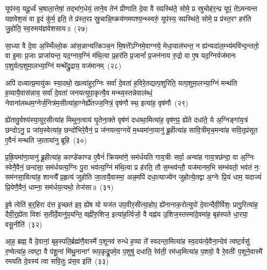 यूप॑स्य॒ यदू॒र्ध्वं च॒षाला॒त्तेषां॒ तद्भा॑ग॒धेयं॒ ताने॒व तेन॑ प्रीणाति दे॒वा वै सꣴस्थि॑ते॒ सोमे॒ प्र स्रुचोह॑र॒न्प्र यूपं॒ ते॑\-ऽमन्यन्त यज्ञवेश॒सं वा इ॒दं कु॑र्म॒ इति॒ ते प्र॑स्त॒रꣴ स्रु॒चान्नि॒ष्क्रय॑णमपश्य॒न्थ्स्वरुं॒ यूप॑स्य॒ सꣴस्थि॑ते॒ सोमे॒ प्र प्र॑स्त॒रꣳ हर॑ति जु॒होति॒ स्व॒रुमय॑ज्ञवेशसाय॥~(२७)

{}%

सा॒ध्या वै दे॒वा अ॒स्मिँल्लो॒क आ॑स॒न्नान्यत्किञ्च॒न मि॒षत्ते᳚\-ऽग्निमे॒वाग्नये॒ मेधा॒याल॑भन्त॒ न ह्य॑न्यदा॑ल॒म्भ्य॑मवि॑न्द॒न्ततो॒ वा इ॒माः प्र॒जाः प्राजा॑यन्त॒ यद॒ग्नाव॒ग्निं म॑थि॒त्वा प्र॒हर॑ति प्र॒जानां᳚ प्र॒जन॑नाय रु॒द्रो वा ए॒ष यद॒ग्निर्यज॑मानः प॒शुर्यत्प॒शुमा॒लभ्या॒ग्निं मन्थे᳚द्रु॒द्राय॒ यज॑मानम्~(२८)

अपि॑ दध्यात्प्र॒मायु॑कः स्या॒दथो॒ खल्वा॑हुर॒ग्निः सर्वा॑ दे॒वता॑ ह॒विरे॒तद्यत्प॒शुरिति॒ यत्प॒शुमा॒लभ्या॒ग्निं मन्थ॑ति ह॒व्यायै॒वास॑न्नाय॒ सर्वा॑ दे॒वता॑ जनयत्युपा॒कृत्यै॒व मन्थ्य॒स्तन्नेवाल॑ब्धं॒ नेवाना॑लब्धम॒ग्नेर्ज॒नित्र॑म॒सीत्या॑हा॒ग्नेर्\mbox{}ह्ये॑तज्ज॒नित्रं॒ वृष॑णौ स्थ॒ इत्या॑ह॒ वृष॑णौ~(२९)

ह्ये॑तावु॒र्वश्य॑स्या॒युर॒सीत्या॑ह मिथुन॒त्वाय॑ घृ॒तेना॒क्ते वृष॑णं दधाथा॒मित्या॑ह॒ वृष॑ण॒ꣴ॒ ह्ये॑ते दधा॑ते॒ ये अ॒ग्निङ्गा॑य॒त्रं छन्दो\-ऽनु॒ प्र जा॑य॒स्वेत्या॑ह॒ छन्दो॑भिरे॒वैनं॒ प्र ज॑नयत्य॒ग्नये॑ म॒थ्यमा॑ना॒यानु॑ ब्रू॒हीत्या॑ह सावि॒त्रीमृच॒मन्वा॑ह सवि॒तृप्र॑सूत ए॒वैनं॑ मन्थति जा॒ताया॑नु ब्रूहि~(३०)

प्र॒ह्रि॒यमा॑णा॒यानु॑ ब्रू॒हीत्या॑ह॒ काण्डे॑काण्ड ए॒वैनं॑ क्रियमा॑णे॒ सम॑र्धयति गाय॒त्रीः सर्वा॒ अन्वा॑ह गाय॒त्रछ॑न्दा॒ वा अ॒ग्निः स्वेनै॒वैनं॒ छन्द॑सा॒ सम॑र्धयत्य॒ग्निः पु॒रा भव॑त्य॒ग्निं म॑थि॒त्वा प्र ह॑रति॒ तौ स॒म्भव॑न्तौ॒ यज॑मानम॒भि सम्भ॑वतो॒ भव॑तं नः॒ सम॑नसा॒वित्या॑ह॒ शान्त्यै᳚ प्र॒हृत्य॑ जुहोति जा॒तायै॒वास्मा॒ अन्न॒मपि॑ दधा॒त्याज्ये॑न जुहोत्ये॒तद्वा अ॒ग्नेः प्रि॒यं धाम॒ यदाज्यं॑ प्रि॒येणै॒वैनं॒ धाम्ना॒ सम॑र्धय॒त्यथो॒ तेज॑सा॥~(३१)

{\anuvakamend[{यज॑मानमाह॒ वृष॑णौ जाता॒यानु॑ब्रू॒ह्यप्य॒ष्टाद॑श च}]}%

इ॒षे त्वेति॑ ब॒र्॒\mbox{}हिरा द॑त्त इ॒च्छत॑ इव॒ ह्ये॑ष यो यज॑त उप॒वीर॒सीत्या॒होप॒ ह्ये॑नानाक॒रोत्युपो॑ दे॒वान्दैवी॒र्विशः॒ प्रागु॒रित्या॑ह॒ दैवी॒र्॒\mbox{}ह्ये॑ता विशः॑ स॒तीर्दे॒वानु॑प॒यन्ति॒ वह्नी॑रु॒शिज॒ इत्या॑ह॒र्त्विजो॒ वै वह्न॑य उ॒शिज॒स्तस्मा॑दे॒वमा॑ह॒ बृह॑स्पते धा॒रया॒ वसू॒नीति॑~(३२)

आ॒ह॒ ब्रह्म॒ वै दे॒वानां॒ बृह॒स्पति॒र्ब्रह्म॑णै॒वास्मै॑ प॒शूनव॑ रुन्धे ह॒व्या ते᳚ स्वदन्ता॒मित्या॑ह स्व॒दय॑त्ये॒वैना॒न्देव॑ त्वष्ट॒र्वसु॑ र॒ण्वेत्या॑ह॒ त्वष्टा॒ वै प॑शू॒नां मि॑थु॒नानाꣳ॑ रूप॒कृद्रू॒पमे॒व प॒शुषु॑ दधाति॒ रेव॑ती॒ रम॑ध्व॒मित्या॑ह प॒शवो॒ वै रे॒वतीः᳚ प॒शूने॒वास्मै॑ रमयति दे॒वस्य॑ त्वा सवि॒तुः प्र॑स॒व इति॑~(३३)

